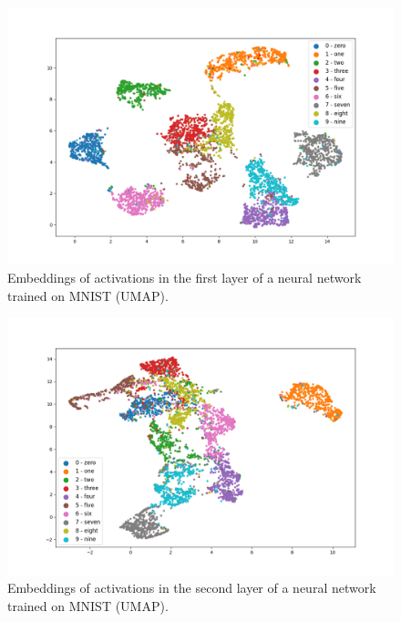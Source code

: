 \documentclass{article}
\begin{document}
\begin{figure}
  \centering
    \includegraphics[width=1.0\textwidth]{../../out/activations_cnn/mnist/umap/trained/plot_l1_f0.png}
    \caption{Embeddings of activations in the first layer of a neural network trained on MNIST (UMAP).}
\end{figure}

\begin{figure}
  \centering
    \includegraphics[width=1.0\textwidth]{../../out/activations_cnn/mnist/umap/trained/plot_l2_f0.png}
    \caption{Embeddings of activations in the second layer of a neural network trained on MNIST (UMAP).}
\end{figure}
\end{document}
